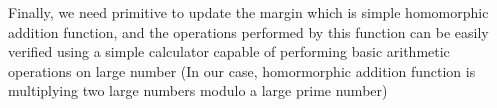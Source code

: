 \documentclass{llncs}
\begin{document}
Finally, we need primitive to update the margin which is simple homomorphic
addition function, and the operations performed by this function 
 can be easily verified using a simple calculator capable of performing 
 basic arithmetic operations on large number (In our case, homormorphic 
 addition function is multiplying two large numbers modulo a large prime 
 number)
\end{document}
